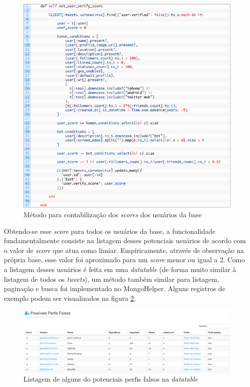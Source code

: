 	
\begin{figure}[!htb]
\centering
\includegraphics[width=15cm]{img/25.png}
\caption[Caption for LOF]{ Método para contabilização dos \textit{scores} dos usuários da base}
\label{fig:metodoscore}
\end{figure}
	
	
	Obtendo-se esse \textit{score} para todos os usuários da base, a funcionalidade fundamentalmente consiste na listagem desses potenciais usuários de acordo com o valor de \textit{score} que atua como limiar. Empiricamente, através de observação na própria base, esse valor foi aproximado para um \textit{score} menor ou igual a 2. Como a listagem desses usuários é feita em uma \textit{datatable} (de forma muito similar à listagem de todos os \textit{tweets}), um método também similar para listagem, paginação e busca foi implementado no MongoHelper. Alguns registros de exemplo podem ser visualizados na figura \ref{fig:fakeusers}.
	
\begin{figure}[!htb]
\centering
\includegraphics[width=15cm]{img/27.png}
\caption[Caption for LOF]{ Listagem de alguns do potenciais perfis falsos na \textit{datatable}}
\label{fig:fakeusers}
\end{figure}
	
